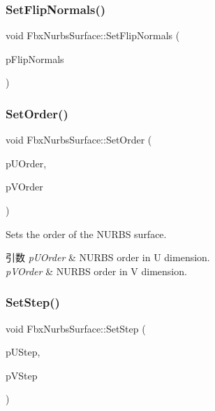 \subsubsection{\texorpdfstring{Set\+Flip\+Normals()}{SetFlipNormals()}}
{\footnotesize\ttfamily void Fbx\+Nurbs\+Surface\+::\+Set\+Flip\+Normals (\begin{DoxyParamCaption}\item[{bool}]{p\+Flip\+Normals }\end{DoxyParamCaption})}

\mbox{\label{class_fbx_nurbs_surface_ad15927332a22dbd3f1f4ae51418d14c4}} 
\subsubsection{\texorpdfstring{Set\+Order()}{SetOrder()}}
{\footnotesize\ttfamily void Fbx\+Nurbs\+Surface\+::\+Set\+Order (\begin{DoxyParamCaption}\item[{\hyperlink{fbxtypes_8h_ae9fb141d8158a730aa85ec5ff2ea3f6b}{Fbx\+U\+Int}}]{p\+U\+Order,  }\item[{\hyperlink{fbxtypes_8h_ae9fb141d8158a730aa85ec5ff2ea3f6b}{Fbx\+U\+Int}}]{p\+V\+Order }\end{DoxyParamCaption})}

Sets the order of the N\+U\+R\+BS surface. 
\begin{DoxyParams}{引数}
{\em p\+U\+Order} & N\+U\+R\+BS order in U dimension. \\
\hline
{\em p\+V\+Order} & N\+U\+R\+BS order in V dimension. \\
\hline
\end{DoxyParams}
\mbox{\label{class_fbx_nurbs_surface_a8da4f135539ccdb54716ea1c2ec0fb89}} 
\subsubsection{\texorpdfstring{Set\+Step()}{SetStep()}}
{\footnotesize\ttfamily void Fbx\+Nurbs\+Surface\+::\+Set\+Step (\begin{DoxyParamCaption}\item[{int}]{p\+U\+Step,  }\item[{int}]{p\+V\+Step }\end{DoxyParamCaption})}

